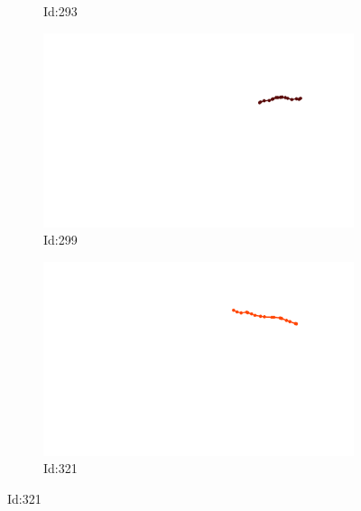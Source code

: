 \documentclass[12pt,twoside]{report}
\begin{document}
\begin{figure}
\begin{subfigure}[b]{0.20\textwidth}
\caption{Id:293}
\end{subfigure}
\begin{subfigure}[b]{0.20\textwidth}
\centering
\includegraphics[width=\textwidth]{../trajectories/299.png}
\caption{Id:299}
\end{subfigure}
\begin{subfigure}[b]{0.20\textwidth}
\centering
\includegraphics[width=\textwidth]{../trajectories/321.png}
\caption{Id:321}
\end{subfigure}
\end{figure}
\end{document}

